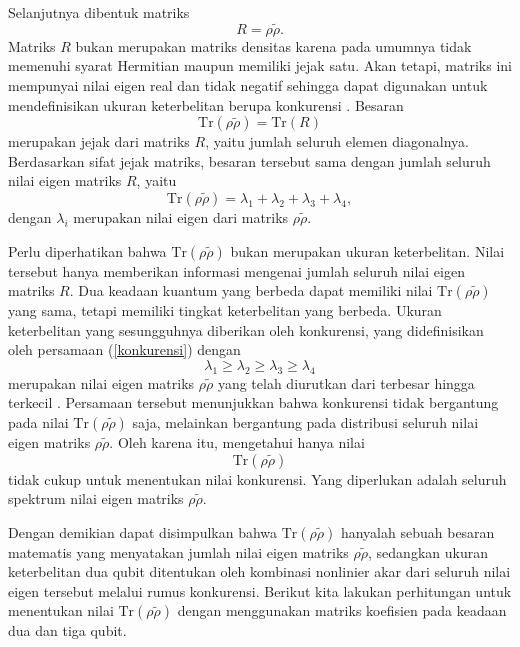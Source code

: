 Selanjutnya dibentuk matriks
\begin{equation}
	R=\rho\tilde{\rho}.
\end{equation}
Matriks $R$ bukan merupakan matriks densitas karena pada umumnya tidak memenuhi syarat Hermitian maupun memiliki jejak satu. Akan tetapi, matriks ini mempunyai nilai eigen real dan tidak negatif sehingga dapat digunakan untuk mendefinisikan ukuran keterbelitan berupa konkurensi \cite{Hill1997,Wootters1998}. Besaran
\begin{equation}
	\mathrm{Tr}(\rho\tilde{\rho})
	=\mathrm{Tr}(R)
\end{equation}
merupakan jejak dari matriks $R$, yaitu jumlah seluruh elemen diagonalnya. Berdasarkan sifat jejak matriks, besaran tersebut sama dengan jumlah seluruh nilai eigen matriks $R$, yaitu
\begin{equation}
	\mathrm{Tr}(\rho\tilde{\rho})
	=\lambda_1+\lambda_2+\lambda_3+\lambda_4,
\end{equation}
dengan $\lambda_i$ merupakan nilai eigen dari matriks $\rho\tilde{\rho}$.

Perlu diperhatikan bahwa $\mathrm{Tr}(\rho\tilde{\rho})$ bukan merupakan ukuran keterbelitan. Nilai tersebut hanya memberikan informasi mengenai jumlah seluruh nilai eigen matriks $R$. Dua keadaan kuantum yang berbeda dapat memiliki nilai $\mathrm{Tr}(\rho\tilde{\rho})$ yang sama, tetapi memiliki tingkat keterbelitan yang berbeda. Ukuran keterbelitan yang sesungguhnya diberikan oleh konkurensi, yang didefinisikan oleh persamaan (\ref{konkurensi})
dengan
\begin{equation}
	\lambda_1\ge\lambda_2\ge\lambda_3\ge\lambda_4
\end{equation}
merupakan nilai eigen matriks $\rho\tilde{\rho}$ yang telah diurutkan dari terbesar hingga terkecil \cite{Wootters1998}. Persamaan tersebut menunjukkan bahwa konkurensi tidak bergantung pada nilai $\mathrm{Tr}(\rho\tilde{\rho})$ saja, melainkan bergantung pada distribusi seluruh nilai eigen matriks $\rho\tilde{\rho}$. Oleh karena itu, mengetahui hanya nilai
\begin{equation}
	\mathrm{Tr}(\rho\tilde{\rho})
\end{equation}
tidak cukup untuk menentukan nilai konkurensi. Yang diperlukan adalah seluruh spektrum nilai eigen matriks $\rho\tilde{\rho}$.

Dengan demikian dapat disimpulkan bahwa $\mathrm{Tr}(\rho\tilde{\rho})$ hanyalah sebuah besaran matematis yang menyatakan jumlah nilai eigen matriks $\rho\tilde{\rho}$, sedangkan ukuran keterbelitan dua qubit ditentukan oleh kombinasi nonlinier akar dari seluruh nilai eigen tersebut melalui rumus konkurensi. Berikut kita lakukan perhitungan untuk menentukan nilai $\mathrm{Tr}(\rho\tilde{\rho})$ dengan menggunakan matriks koefisien pada keadaan dua dan tiga qubit.
